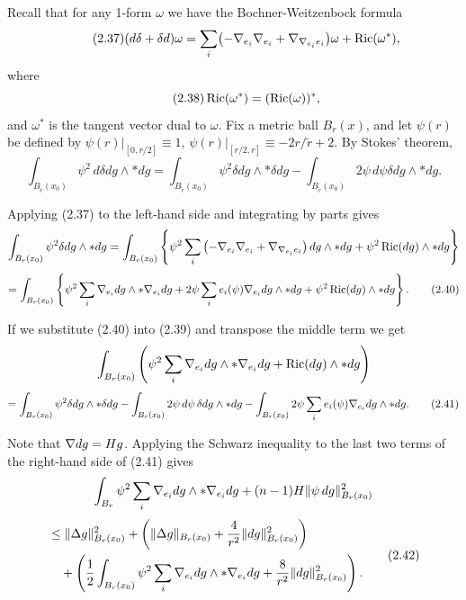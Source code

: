 Recall that for any 1-form $\omega$ we have the Bochner-Weitzenbock formula
\begin{equation}\tag{2.37}
(d\delta+\delta d)\omega=\sum_i\bigl(-\nabla_{e_i}\nabla_{e_i}+\nabla_{\nabla_{e_i}e_i}\bigr)\omega+\operatorname{Ric}(\omega^*),
\end{equation}
where
\begin{equation}\tag{2.38}
\operatorname{Ric}(\omega^*)=(\operatorname{Ric}(\omega))^*,
\end{equation}
and $\omega^*$ is the tangent vector dual to $\omega$. Fix a metric ball $B_r(x)$, and let $\psi(r)$ be defined by $\psi(r)|_{[0,r/2]}\equiv 1$, $\psi(r)|_{[r/2,r]}\equiv -2r/\tilde r+2$. By Stokes' theorem,
\begin{equation}\tag{2.39}
\int_{B_{\tilde r}(x_0)}\psi^2\, d\delta dg\wedge *dg
=\int_{B_{\tilde r}(x_0)}\psi^2\delta dg\wedge *\delta dg
-\int_{B_{\tilde r}(x_0)}2\psi\, d\psi\delta dg\wedge *dg.
\end{equation}

Applying (2.37) to the left-hand side and integrating by parts gives
\[
\int_{B_r(x_0)} \psi^2 \delta dg \wedge *dg
= \int_{B_r(x_0)} \left\{ \psi^2 \sum_i \left(-\nabla_{e_i}\nabla_{e_i} + \nabla_{\nabla_{e_i} e_i}\right)dg \wedge *dg + \psi^2 \operatorname{Ric}(dg) \wedge *dg \right\}
\]
\begin{equation}
= \int_{B_r(x_0)} \left\{ \psi^2 \sum_i \nabla_{e_i}dg \wedge *\nabla_{e_i}dg + 2\psi \sum_i e_i(\psi)\nabla_{e_i}dg \wedge *dg
+ \psi^2 \operatorname{Ric}(dg) \wedge *dg \right\}.
\tag{2.40}
\end{equation}

If we substitute (2.40) into (2.39) and transpose the middle term we get
\[
\int_{B_r(x_0)} \left( \psi^2 \sum_i \nabla_{e_i}dg \wedge *\nabla_{e_i}dg + \operatorname{Ric}(dg)\wedge *dg \right)
\]
\begin{equation}
= \int_{B_r(x_0)} \psi^2 \delta dg \wedge *\delta dg
- \int_{B_r(x_0)} 2\psi\, d\psi\,\delta dg \wedge *dg
- \int_{B_r(x_0)} 2\psi \sum_i e_i(\psi)\nabla_{e_i}dg \wedge *dg.
\tag{2.41}
\end{equation}

Note that $\nabla dg = Hg$. Applying the Schwarz inequality to the last two terms of the right-hand side of (2.41) gives
\[
\int_{B_r} \psi^2 \sum_i \nabla_{e_i}dg \wedge *\nabla_{e_i}dg + (n-1)H \|\psi\,dg\|^2_{B_r(x_0)}
\]
\begin{equation}
\begin{aligned}
&\le \|\Delta g\|^2_{B_r(x_0)}
+ \left(\|\Delta g\|_{B_r(x_0)} + \frac{4}{r^2}\|dg\|^2_{B_r(x_0)}\right) \\
&\quad + \left(\frac12\int_{B_r(x_0)} \psi^2 \sum_i \nabla_{e_i}dg \wedge *\nabla_{e_i}dg
+ \frac{8}{r^2}\|dg\|^2_{B_r(x_0)}\right).
\end{aligned}
\tag{2.42}
\end{equation}

